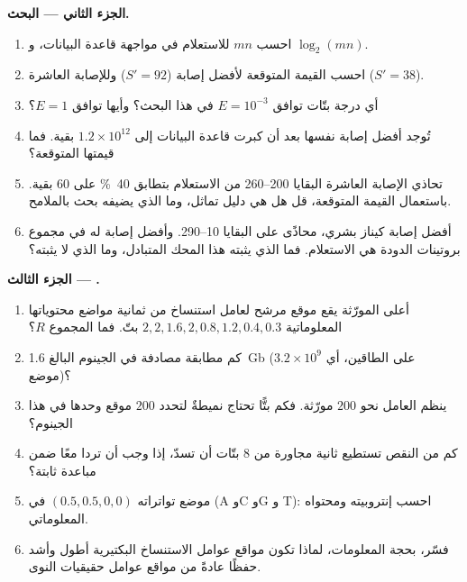 \begin{problem}
\medskip
\noindent\textbf{الجزء الثاني --- البحث.}
\begin{enumerate}[resume]
  \item احسب $mn$ للاستعلام في مواجهة قاعدة البيانات، و
        $\log_{2}(mn)$.
  \item احسب القيمة المتوقعة لأفضل إصابة ($S' = 92$) وللإصابة
        العاشرة ($S' = 38$).
  \item أي درجة بتّات توافق $E = 10^{-3}$ في هذا البحث؟
        وأيها توافق $E = 1$؟
  \item تُوجد أفضل إصابة نفسها بعد أن كبرت قاعدة البيانات إلى
        $1.2\times 10^{12}$ بقية. فما قيمتها المتوقعة؟
  \item تحاذي الإصابة العاشرة البقايا 200--260 من الاستعلام بتطابق
        \qty{40}{\%} على $60$ بقية. باستعمال القيمة المتوقعة،
        قل هل هي دليل تماثل، وما الذي يضيفه بحث
        بالملامح.
  \item أفضل إصابة كيناز بشري، محاذًى على البقايا 10--290.
        وأفضل إصابة له في مجموع بروتينات الدودة هي الاستعلام. فما الذي
        يثبته هذا المحك المتبادل، وما الذي لا يثبته؟
\end{enumerate}

\medskip
\noindent\textbf{الجزء الثالث --- .}
\begin{enumerate}[resume]
  \item أعلى المورّثة يقع موقع مرشح لعامل استنساخ
        من ثمانية مواضع محتوياتها المعلوماتية
        $2, 2, 1.6, 2, 0.8, 1.2, 0.4, 0.3$ بتّ. فما المجموع $R$؟
  \item كم مطابقة مصادفة  في الجينوم البالغ
        \qty{1.6}{Gb} (على الطاقين، أي $3.2\times 10^{9}$
        موضع)؟
  \item ينظم العامل نحو $200$ مورّثة. فكم بتًّا تحتاج
        نميطةٌ لتحدد $200$ موقع وحدها في هذا الجينوم؟
  \item كم من النقص تستطيع  ثانية مجاورة من
        $8$ بتّات أن تسدّ، إذا وجب أن تردا معًا ضمن مباعدة
        ثابتة؟
  \item موضع تواتراته $(0.5, 0.5, 0, 0)$ في (A وC وG و
        T): احسب إنتروبيته ومحتواه المعلوماتي.
  \item فسّر، بحجة المعلومات، لماذا تكون مواقع عوامل
        الاستنساخ البكتيرية أطول وأشد حفظًا عادةً من مواقع
        عوامل حقيقيات النوى.
\end{enumerate}


\end{problem}
